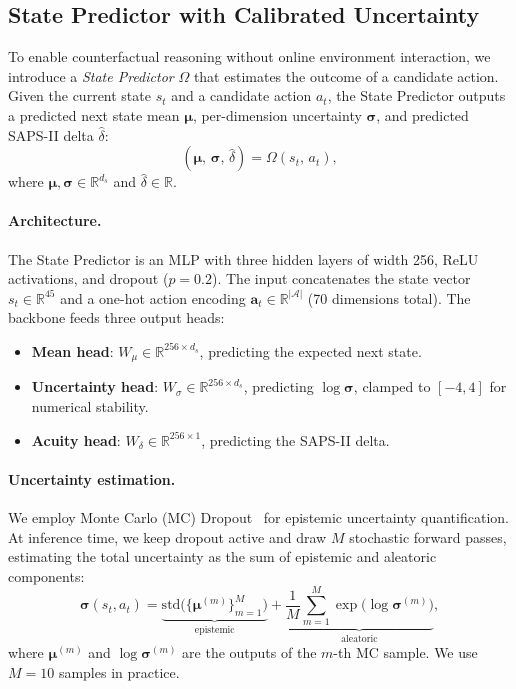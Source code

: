 \subsection{State Predictor with Calibrated Uncertainty}
\label{sec:state_predictor}

To enable counterfactual reasoning without online environment interaction, we introduce a \textit{State Predictor} $\Omega$ that estimates the outcome of a candidate action. Given the current state $s_t$ and a candidate action $a_t$, the State Predictor outputs a predicted next state mean $\boldsymbol{\mu}$, per-dimension uncertainty $\boldsymbol{\sigma}$, and predicted SAPS-II delta $\hat{\delta}$:
\begin{equation}
    (\boldsymbol{\mu},\, \boldsymbol{\sigma},\, \hat{\delta}) = \Omega(s_t,\, a_t),
\end{equation}
where $\boldsymbol{\mu}, \boldsymbol{\sigma} \in \mathbb{R}^{d_s}$ and $\hat{\delta} \in \mathbb{R}$.

\paragraph{Architecture.} The State Predictor is an MLP with three hidden layers of width 256, ReLU activations, and dropout ($p = 0.2$). The input concatenates the state vector $s_t \in \mathbb{R}^{45}$ and a one-hot action encoding $\mathbf{a}_t \in \mathbb{R}^{|\mathcal{A}|}$ (70 dimensions total). The backbone feeds three output heads:
\begin{itemize}
    \item \textbf{Mean head}: $W_{\mu} \in \mathbb{R}^{256 \times d_s}$, predicting the expected next state.
    \item \textbf{Uncertainty head}: $W_{\sigma} \in \mathbb{R}^{256 \times d_s}$, predicting $\log\boldsymbol{\sigma}$, clamped to $[-4, 4]$ for numerical stability.
    \item \textbf{Acuity head}: $W_{\delta} \in \mathbb{R}^{256 \times 1}$, predicting the SAPS-II delta.
\end{itemize}

\paragraph{Uncertainty estimation.} We employ Monte Carlo (MC) Dropout~\cite{gal2016dropout} for epistemic uncertainty quantification. At inference time, we keep dropout active and draw $M$ stochastic forward passes, estimating the total uncertainty as the sum of epistemic and aleatoric components:
\begin{equation}
    \boldsymbol{\sigma}(s_t, a_t) = \underbrace{\text{std}\bigl(\{\boldsymbol{\mu}^{(m)}\}_{m=1}^{M}\bigr)}_{\text{epistemic}} + \underbrace{\frac{1}{M}\sum_{m=1}^{M}\exp\bigl(\log\boldsymbol{\sigma}^{(m)}\bigr)}_{\text{aleatoric}},
\end{equation}
where $\boldsymbol{\mu}^{(m)}$ and $\log\boldsymbol{\sigma}^{(m)}$ are the outputs of the $m$-th MC sample. We use $M = 10$ samples in practice.

